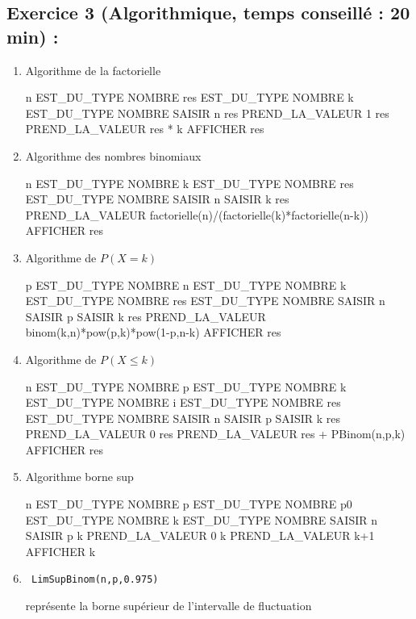 \subsection*{Exercice 3 (Algorithmique, temps conseillé : 20 min) : }
\begin{enumerate}
\item Algorithme de la factorielle
\begin{algobox}
\Variables
\Ligne n EST\_DU\_TYPE NOMBRE
\Ligne res EST\_DU\_TYPE NOMBRE
\Ligne k EST\_DU\_TYPE NOMBRE
\DebutAlgo
\Ligne SAISIR n
\Ligne res PREND\_LA\_VALEUR 1
\DebutPour
\Ligne res PREND\_LA\_VALEUR res * k
\FinPour
\Ligne AFFICHER res
\FinAlgo

\end{algobox}
\item Algorithme des nombres binomiaux
\begin{algobox}
\Variables
\Ligne n EST\_DU\_TYPE NOMBRE
\Ligne k EST\_DU\_TYPE NOMBRE
\Ligne res EST\_DU\_TYPE NOMBRE
\DebutAlgo
\Ligne SAISIR n
\Ligne SAISIR k
\Ligne res PREND\_LA\_VALEUR factorielle(n)/(factorielle(k)*factorielle(n-k))
\Ligne AFFICHER res
\FinAlgo

\end{algobox}
\item Algorithme de $P(X=k)$
\begin{algobox}
\Variables
\Ligne p EST\_DU\_TYPE NOMBRE
\Ligne n EST\_DU\_TYPE NOMBRE
\Ligne k EST\_DU\_TYPE NOMBRE
\Ligne res EST\_DU\_TYPE NOMBRE
\DebutAlgo
\Ligne SAISIR n
\Ligne SAISIR p
\Ligne SAISIR k
\Ligne res PREND\_LA\_VALEUR binom(k,n)*pow(p,k)*pow(1-p,n-k)
\Ligne AFFICHER res
\FinAlgo
\end{algobox}
\item Algorithme de $P(X\leq k)$
\begin{algobox}
\Variables
\Ligne n EST\_DU\_TYPE NOMBRE
\Ligne p EST\_DU\_TYPE NOMBRE
\Ligne k EST\_DU\_TYPE NOMBRE
\Ligne i EST\_DU\_TYPE NOMBRE
\Ligne res EST\_DU\_TYPE NOMBRE
\DebutAlgo
\Ligne SAISIR n
\Ligne SAISIR p
\Ligne SAISIR k
\Ligne res PREND\_LA\_VALEUR 0
\DebutPour
\Ligne res PREND\_LA\_VALEUR res + PBinom(n,p,k)
\FinPour
\Ligne AFFICHER res
\FinAlgo

\end{algobox}
\item Algorithme borne sup
\begin{algobox}
\Variables
\Ligne n EST\_DU\_TYPE NOMBRE
\Ligne p EST\_DU\_TYPE NOMBRE
\Ligne p0 EST\_DU\_TYPE NOMBRE
\Ligne k EST\_DU\_TYPE NOMBRE
\DebutAlgo
\Ligne SAISIR n
\Ligne SAISIR p
\Ligne k PREND\_LA\_VALEUR 0
\DebutTantQue
\Ligne k PREND\_LA\_VALEUR k+1
\FinTantQue
\Ligne AFFICHER k
\FinAlgo

\end{algobox}
\item \begin{verbatim} LimSupBinom(n,p,0.975) \end{verbatim} représente la borne supérieur de l'intervalle de fluctuation
\end{enumerate}

